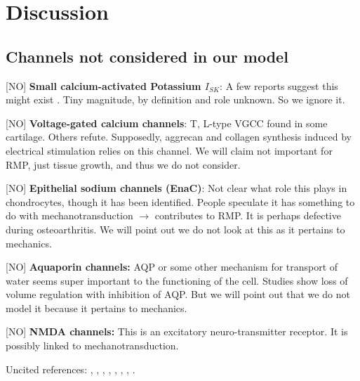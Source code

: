 \section{Discussion}
\label{sec:discussion}



\subsection{Channels not considered in our model}
\label{sec:channels-ignored}

[NO] {\bf Small calcium-activated Potassium $I_{SK}$}: A few reports
suggest this might exist \citep{Halletal1996,
  BarrettJolleyetal2010}. Tiny magnitude, by definition and role
unknown. So we ignore it.

[NO] {\bf Voltage-gated calcium channels}: T, L-type VGCC found in
some cartilage. Others refute. Supposedly, aggrecan and collagen
synthesis induced by electrical stimulation relies on this channel. We
will claim not important for RMP, just tissue growth, and thus we do
not consider.

[NO] {\bf Epithelial sodium channels (EnaC)}: Not clear what role this
plays in chondrocytes, though it has been identified. People speculate
it has something to do with mechanotransduction $\rightarrow$
contributes to RMP. It is perhaps defective during osteoarthritis. We
will point out we do not look at this as it pertains to mechanics.

[NO] {\bf Aquaporin channels:} AQP or some other mechanism for
transport of water seems super important to the functioning of the
cell. Studies show loss of volume regulation with inhibition of
AQP. But we will point out that we do not model it because it pertains
to mechanics.

[NO] {\bf NMDA channels:} This is an excitatory neuro-transmitter
receptor. It is possibly linked to mechanotransduction.


Uncited references:
\cite{ArcherWest2003},
\cite{Grishkoetal2010},
\cite{Hille2001},
\cite{LesageLazdunski2000},
\cite{MillwardSadleretal2000},
\cite{Nygrenetal1998},
\cite{Scholz2002},
\cite{Tsugaetal2001}.

